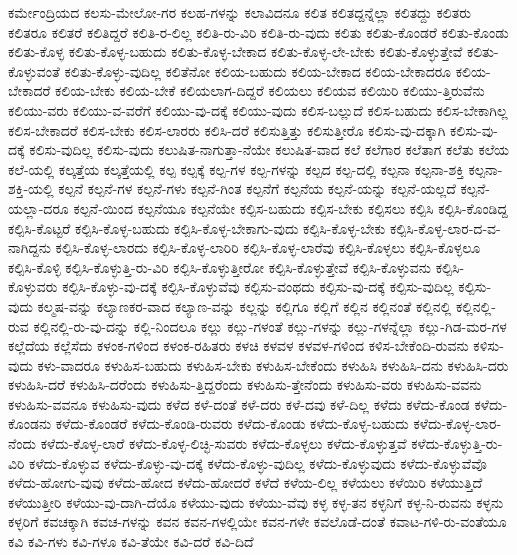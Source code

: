 {ಕರ್ಮೇಂದ್ರಿಯದ
ಕಲಸು-ಮೇಲೋ-ಗರ
ಕಲಹ-ಗಳನ್ನು
ಕಲಾವಿದನೂ
ಕಲಿತ
ಕಲಿತದ್ದನ್ನೆಲ್ಲಾ
ಕಲಿತದ್ದು
ಕಲಿತರು
ಕಲಿತರೂ
ಕಲಿತರೆ
ಕಲಿತಿದ್ದರೆ
ಕಲಿತಿ-ರ-ಲಿಲ್ಲ
ಕಲಿತಿ-ರು-ವಿರಿ
ಕಲಿತಿ-ರು-ವುದು
ಕಲಿತು
ಕಲಿತು-ಕೊಂಡರೆ
ಕಲಿತು-ಕೊಂಡು
ಕಲಿತು-ಕೊಳ್ಳ
ಕಲಿತು-ಕೊಳ್ಳ-ಬಹುದು
ಕಲಿತು-ಕೊಳ್ಳ-ಬೇಕಾದ
ಕಲಿತು-ಕೊಳ್ಳ-ಲೇ-ಬೇಕು
ಕಲಿತು-ಕೊಳ್ಳುತ್ತೇವೆ
ಕಲಿತು-ಕೊಳ್ಳುವಂತೆ
ಕಲಿತು-ಕೊಳ್ಳು-ವುದಿಲ್ಲ
ಕಲಿತೆನೋ
ಕಲಿಯ-ಬಹುದು
ಕಲಿಯ-ಬೇಕಾದ
ಕಲಿಯ-ಬೇಕಾದರೂ
ಕಲಿಯ-ಬೇಕಾದರೆ
ಕಲಿಯ-ಬೇಕು
ಕಲಿಯ-ಬೇಕೆ
ಕಲಿಯಲಾಗ-ದಿದ್ದರೆ
ಕಲಿಯಲು
ಕಲಿಯವ
ಕಲಿಯಿರಿ
ಕಲಿಯು-ತ್ತಿರುವೆನು
ಕಲಿಯು-ವರು
ಕಲಿಯು-ವ-ವರೆಗೆ
ಕಲಿಯು-ವು-ದಕ್ಕೆ
ಕಲಿಯು-ವುದು
ಕಲಿಸ-ಬಲ್ಲುದೆ
ಕಲಿಸ-ಬಹುದು
ಕಲಿಸ-ಬೇಕಾಗಿಲ್ಲ
ಕಲಿಸ-ಬೇಕಾದರೆ
ಕಲಿಸ-ಬೇಕು
ಕಲಿಸ-ಲಾರರು
ಕಲಿಸಿ-ದರೆ
ಕಲಿಸುತ್ತಿತ್ತು
ಕಲಿಸುತ್ತೀರೊ
ಕಲಿಸು-ವು-ದಕ್ಕಾಗಿ
ಕಲಿಸು-ವು-ದಕ್ಕೆ
ಕಲಿಸು-ವುದಿಲ್ಲ
ಕಲಿಸು-ವುದು
ಕಲುಷಿತ-ನಾಗುತ್ತಾ-ನೆಯೇ
ಕಲುಷಿತ-ವಾದ
ಕಲೆ
ಕಲೆಗಾರ
ಕಲೆತಾಗ
ಕಲೆತು
ಕಲೆಯ
ಕಲೆ-ಯಲ್ಲಿ
ಕಲ್ಕತ್ತೆಯ
ಕಲ್ಕತ್ತೆಯಲ್ಲಿ
ಕಲ್ಪ
ಕಲ್ಪಕ್ಕೆ
ಕಲ್ಪ-ಗಳ
ಕಲ್ಪ-ಗಳನ್ನು
ಕಲ್ಪದ
ಕಲ್ಪ-ದಲ್ಲಿ
ಕಲ್ಪನಾ
ಕಲ್ಪನಾ-ಶಕ್ತಿ
ಕಲ್ಪನಾ-ಶಕ್ತಿ-ಯಲ್ಲಿ
ಕಲ್ಪನೆ
ಕಲ್ಪನೆ-ಗಳ
ಕಲ್ಪನೆ-ಗಳು
ಕಲ್ಪನೆ-ಗಿಂತ
ಕಲ್ಪನೆಗೆ
ಕಲ್ಪನೆಯ
ಕಲ್ಪನೆ-ಯನ್ನು
ಕಲ್ಪನೆ-ಯಲ್ಲದೆ
ಕಲ್ಪನೆ-ಯಲ್ಲಾ-ದರೂ
ಕಲ್ಪನೆ-ಯಿಂದ
ಕಲ್ಪನೆಯೂ
ಕಲ್ಪನೆಯೇ
ಕಲ್ಪಿಸ-ಬಹುದು
ಕಲ್ಪಿಸ-ಬೇಕು
ಕಲ್ಪಿಸಲು
ಕಲ್ಪಿಸಿ
ಕಲ್ಪಿಸಿ-ಕೊಂಡಿದ್ದ
ಕಲ್ಪಿಸಿ-ಕೊಟ್ಟರೆ
ಕಲ್ಪಿಸಿ-ಕೊಳ್ಳ-ಬಹುದು
ಕಲ್ಪಿಸಿ-ಕೊಳ್ಳ-ಬೇಕಾಗು-ವುದು
ಕಲ್ಪಿಸಿ-ಕೊಳ್ಳ-ಬೇಕು
ಕಲ್ಪಿಸಿ-ಕೊಳ್ಳ-ಲಾರ-ದ-ವ-ನಾಗಿದ್ದನು
ಕಲ್ಪಿಸಿ-ಕೊಳ್ಳ-ಲಾರದು
ಕಲ್ಪಿಸಿ-ಕೊಳ್ಳ-ಲಾರಿರಿ
ಕಲ್ಪಿಸಿ-ಕೊಳ್ಳ-ಲಾರೆವು
ಕಲ್ಪಿಸಿ-ಕೊಳ್ಳಲು
ಕಲ್ಪಿಸಿ-ಕೊಳ್ಳಲೂ
ಕಲ್ಪಿಸಿ-ಕೊಳ್ಳಿ
ಕಲ್ಪಿಸಿ-ಕೊಳ್ಳುತ್ತಿ-ರು-ವಿರಿ
ಕಲ್ಪಿಸಿ-ಕೊಳ್ಳುತ್ತೀರೋ
ಕಲ್ಪಿಸಿ-ಕೊಳ್ಳುತ್ತೇವೆ
ಕಲ್ಪಿಸಿ-ಕೊಳ್ಳುವನು
ಕಲ್ಪಿಸಿ-ಕೊಳ್ಳುವರು
ಕಲ್ಪಿಸಿ-ಕೊಳ್ಳು-ವು-ದಕ್ಕೆ
ಕಲ್ಪಿಸಿ-ಕೊಳ್ಳುವೆವು
ಕಲ್ಪಿಸು-ವಂಥದು
ಕಲ್ಪಿಸು-ವು-ದಕ್ಕೆ
ಕಲ್ಪಿಸು-ವುದಿಲ್ಲ
ಕಲ್ಪಿಸು-ವುದು
ಕಲ್ಮಷ-ವನ್ನು
ಕಲ್ಯಾಣಕರ-ವಾದ
ಕಲ್ಯಾಣ-ವನ್ನು
ಕಲ್ಲನ್ನು
ಕಲ್ಲಿಗೂ
ಕಲ್ಲಿಗೆ
ಕಲ್ಲಿನ
ಕಲ್ಲಿನಂತೆ
ಕಲ್ಲಿನಲ್ಲಿ
ಕಲ್ಲಿನಲ್ಲಿ-ರುವ
ಕಲ್ಲಿನಲ್ಲಿ-ರು-ವು-ದನ್ನು
ಕಲ್ಲಿ-ನಿಂದಲೂ
ಕಲ್ಲು
ಕಲ್ಲು-ಗಳಂತೆ
ಕಲ್ಲು-ಗಳನ್ನು
ಕಲ್ಲು-ಗಳನ್ನೆಲ್ಲಾ
ಕಲ್ಲು-ಗಿಡ-ಮರ-ಗಳ
ಕಲ್ಲೆದೆಯ
ಕಲ್ಲೆಸೆದು
ಕಳಂಕ-ಗಳಿಂದ
ಕಳಂಕ-ರಹಿತರು
ಕಳಚಿ
ಕಳವಳ
ಕಳವಳ-ಗಳಿಂದ
ಕಳಿಸ-ಬೇಕೆಂದಿ-ರುವನು
ಕಳಿಸು-ವುದು
ಕಳು-ವಾದರೂ
ಕಳುಹಿಸ-ಬಹುದು
ಕಳುಹಿಸ-ಬೇಕು
ಕಳುಹಿಸ-ಬೇಕೆಂದು
ಕಳುಹಿಸಿ
ಕಳುಹಿಸಿ-ದನು
ಕಳುಹಿಸಿ-ದರು
ಕಳುಹಿಸಿ-ದರೆ
ಕಳುಹಿಸಿ-ದರೆಂದು
ಕಳುಹಿಸು-ತ್ತಿದ್ದರೆಂದು
ಕಳುಹಿಸು-ತ್ತೇನೆಂದು
ಕಳುಹಿಸು-ವರು
ಕಳುಹಿಸು-ವವನು
ಕಳುಹಿಸು-ವವನೂ
ಕಳುಹಿಸು-ವುದು
ಕಳೆದ
ಕಳೆ-ದಂತೆ
ಕಳೆ-ದರು
ಕಳೆ-ದವು
ಕಳೆ-ದಿಲ್ಲ
ಕಳೆದು
ಕಳೆದು-ಕೊಂಡ
ಕಳೆದು-ಕೊಂಡನು
ಕಳೆದು-ಕೊಂಡರೆ
ಕಳೆದು-ಕೊಂಡಿ-ರುವರು
ಕಳೆದು-ಕೊಂಡು
ಕಳೆದು-ಕೊಳ್ಳ-ಬಹುದು
ಕಳೆದು-ಕೊಳ್ಳ-ಲಾರ-ನೆಂದು
ಕಳೆದು-ಕೊಳ್ಳ-ಲಾರೆ
ಕಳೆದು-ಕೊಳ್ಳ-ಲಿಚ್ಛಿ-ಸುವರು
ಕಳೆದು-ಕೊಳ್ಳಲು
ಕಳೆದು-ಕೊಳ್ಳುತ್ತವೆ
ಕಳೆದು-ಕೊಳ್ಳುತ್ತಿ-ರು-ವಿರಿ
ಕಳೆದು-ಕೊಳ್ಳುವ
ಕಳೆದು-ಕೊಳ್ಳು-ವು-ದಕ್ಕೆ
ಕಳೆದು-ಕೊಳ್ಳು-ವುದಿಲ್ಲ
ಕಳೆದು-ಕೊಳ್ಳುವುದು
ಕಳೆದು-ಕೊಳ್ಳುವೆವೊ
ಕಳೆದು-ಹೋಗು-ವುವು
ಕಳೆದು-ಹೋದ
ಕಳೆದು-ಹೋದರೆ
ಕಳೆದೆ
ಕಳೆಯ-ಲಿಲ್ಲ
ಕಳೆಯಲು
ಕಳೆಯಿರಿ
ಕಳೆಯುತ್ತಿದೆ
ಕಳೆಯುತ್ತೀರಿ
ಕಳೆಯು-ವು-ದಾಗಿ-ದೆಯೊ
ಕಳೆಯು-ವುದು
ಕಳೆಯು-ವೆವು
ಕಳ್ಳ
ಕಳ್ಳ-ತನ
ಕಳ್ಳನಿಗೆ
ಕಳ್ಳ-ನಿ-ರುವನು
ಕಳ್ಳನು
ಕಳ್ಳರಿಗೆ
ಕವಚಕ್ಕಾಗಿ
ಕವಚ-ಗಳನ್ನು
ಕವನ
ಕವನ-ಗಳಲ್ಲಿಯೇ
ಕವನ-ಗಳೇ
ಕವಲೊಡೆ-ದಂತೆ
ಕವಾಟ-ಗಳಿ-ರು-ವಂತೆಯೂ
ಕವಿ
ಕವಿ-ಗಳು
ಕವಿ-ಗಳೂ
ಕವಿ-ತೆಯೇ
ಕವಿ-ದರೆ
ಕವಿ-ದಿದೆ
}
